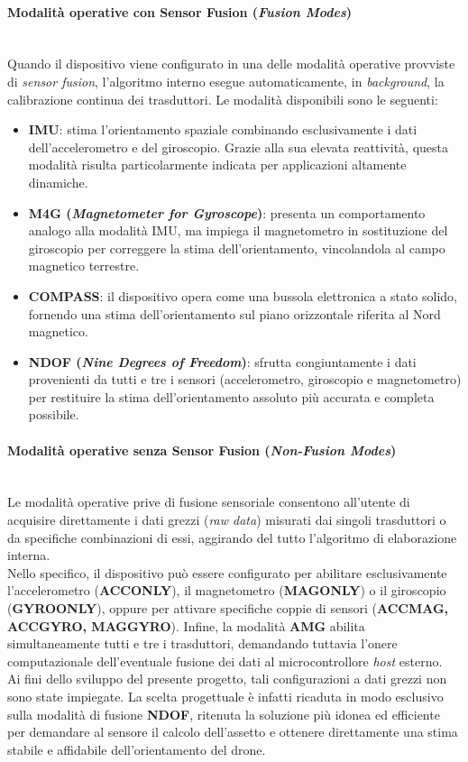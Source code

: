 \documentclass[11pt]{report}
\begin{document}
	\paragraph{Modalità operative con Sensor Fusion (\textit{Fusion Modes})}\mbox{}\\
	Quando il dispositivo viene configurato in una delle modalità operative provviste di \textit{sensor fusion}, l'algoritmo interno esegue automaticamente, in \textit{background}, la calibrazione continua dei trasduttori. Le modalità disponibili sono le seguenti:
	\begin{itemize}
		\item \textbf{IMU}: stima l'orientamento spaziale combinando esclusivamente i dati dell'accelerometro e del giroscopio. Grazie alla sua elevata reattività, questa modalità risulta particolarmente indicata per applicazioni altamente dinamiche.
		\item \textbf{M4G (\textit{Magnetometer for Gyroscope})}: presenta un comportamento analogo alla modalità IMU, ma impiega il magnetometro in sostituzione del giroscopio per correggere la stima dell'orientamento, vincolandola al campo magnetico terrestre.
		\item \textbf{COMPASS}: il dispositivo opera come una bussola elettronica a stato solido, fornendo una stima dell'orientamento sul piano orizzontale riferita al Nord magnetico.
		\item \textbf{NDOF (\textit{Nine Degrees of Freedom})}: sfrutta congiuntamente i dati provenienti da tutti e tre i sensori (accelerometro, giroscopio e magnetometro) per restituire la stima dell'orientamento assoluto più accurata e completa possibile.
	\end{itemize}
	
	\paragraph{Modalità operative senza Sensor Fusion (\textit{Non-Fusion Modes})}\mbox{}\\
	Le modalità operative prive di fusione sensoriale consentono all'utente di acquisire direttamente i dati grezzi (\textit{raw data}) misurati dai singoli trasduttori o da specifiche combinazioni di essi, aggirando del tutto l'algoritmo di elaborazione interna.\\
	Nello specifico, il dispositivo può essere configurato per abilitare esclusivamente l'accelerometro (\textbf{ACCONLY}), il magnetometro (\textbf{MAGONLY}) o il giroscopio (\textbf{GYROONLY}), oppure per attivare specifiche coppie di sensori (\textbf{ACCMAG, ACCGYRO, MAGGYRO}). Infine, la modalità \textbf{AMG} abilita simultaneamente tutti e tre i trasduttori, demandando tuttavia l'onere computazionale dell'eventuale fusione dei dati al microcontrollore \textit{host} esterno.\\
	Ai fini dello sviluppo del presente progetto, tali configurazioni a dati grezzi non sono state impiegate. La scelta progettuale è infatti ricaduta in modo esclusivo sulla modalità di fusione \textbf{NDOF}, ritenuta la soluzione più idonea ed efficiente per demandare al sensore il calcolo dell'assetto e ottenere direttamente una stima stabile e affidabile dell'orientamento del drone.
	
\end{document}
